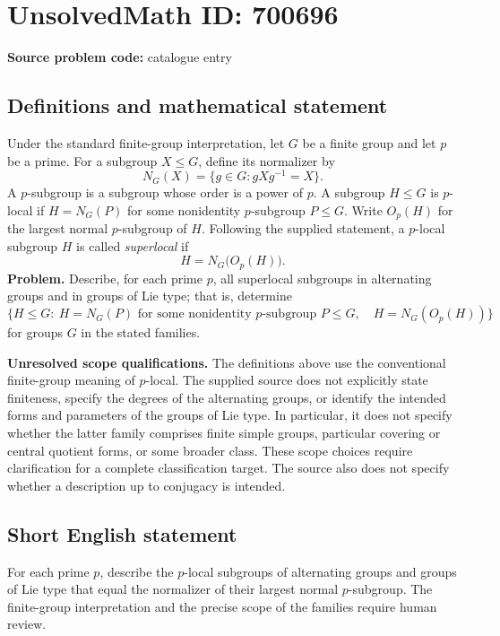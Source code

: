 \documentclass[11pt]{article}
\begin{document}
\section*{UnsolvedMath ID: 700696}
\textbf{Source problem code:} catalogue entry
\subsection{Definitions and mathematical statement}
Under the standard finite-group interpretation, let \(G\) be a finite group and let \(p\) be a prime. For a subgroup \(X\leq G\), define its normalizer by
\[
N_G(X)=\{g\in G:gXg^{-1}=X\}.
\]
A \(p\)-subgroup is a subgroup whose order is a power of \(p\). A subgroup \(H\leq G\) is \(p\)-local if \(H=N_G(P)\) for some nonidentity \(p\)-subgroup \(P\leq G\). Write \(O_p(H)\) for the largest normal \(p\)-subgroup of \(H\). Following the supplied statement, a \(p\)-local subgroup \(H\) is called \emph{superlocal} if
\[
H=N_G\bigl(O_p(H)\bigr).
\]
\textbf{Problem.} Describe, for each prime \(p\), all superlocal subgroups in alternating groups and in groups of Lie type; that is, determine
\[
\bigl\{H\leq G:\ H=N_G(P)\text{ for some nonidentity }p\text{-subgroup }P\leq G,\quad H=N_G(O_p(H))\bigr\}
\]
for groups \(G\) in the stated families.

\textbf{Unresolved scope qualifications.} The definitions above use the conventional finite-group meaning of \(p\)-local. The supplied source does not explicitly state finiteness, specify the degrees of the alternating groups, or identify the intended forms and parameters of the groups of Lie type. In particular, it does not specify whether the latter family comprises finite simple groups, particular covering or central quotient forms, or some broader class. These scope choices require clarification for a complete classification target. The source also does not specify whether a description up to conjugacy is intended.
\subsection{Short English statement}
For each prime \(p\), describe the \(p\)-local subgroups of alternating groups and groups of Lie type that equal the normalizer of their largest normal \(p\)-subgroup. The finite-group interpretation and the precise scope of the families require human review.
\end{document}
